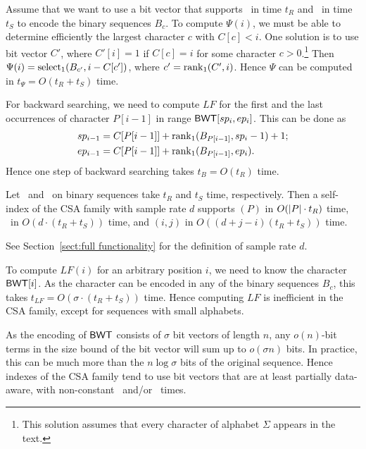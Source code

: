 Assume that we want to use a bit vector that supports \rank\ in time $t_{R}$ and \select\ in time $t_{S}$ to encode the binary sequences $B_{c}$. To compute $\Psi(i)$, we must be able to determine efficiently the largest character $c$ with $C[c] < i$. One solution is to use bit vector $C'$, where $C'[i] = 1$ if $C[c] = i$ for some character $c > 0$.\footnote{This solution assumes that every character of alphabet $\Sigma$ appears in the text.} Then $\Psi(i) = \operatorname{select}_{1}(B_{c'}, i - C[c'])$, where $c' = \operatorname{rank}_{1}(C',i)$. Hence $\Psi$ can be computed in $t_{\Psi} = O(t_{R} + t_{S})$ time.

For backward searching, we need to compute $LF$ for the first and the last occurrences of character $P[i-1]$ in range $\mathsf{BWT}[sp_{i},ep_{i}]$. This can be done as
\begin{align*}
sp_{i-1} & = C[P[i-1]] + \operatorname{rank}_{1}(B_{P[i-1]}, sp_{i}-1) + 1; \\
ep_{i-1} & = C[P[i-1]] + \operatorname{rank}_{1}(B_{P[i-1]}, ep_{i}).
\end{align*}
Hence one step of backward searching takes $t_{B} = O(t_{R})$ time.

\begin{theorem}\label{theorem:csa}
Let \rank\ and \select\ on binary sequences take $t_{R}$ and $t_{S}$ time, respectively. Then a self-index of the CSA family with sample rate $d$ supports \find$(P)$ in $O(\lvert P \rvert \cdot t_{R})$ time, \locate\ in $O(d \cdot (t_{R} + t_{S}))$ time, and \extract$(i,j)$ in $O((d + j - i)(t_{R} + t_{S}))$ time.
\end{theorem}

See Section~\ref{sect:full functionality} for the definition of sample rate $d$.

To compute $LF(i)$ for an arbitrary position $i$, we need to know the character $\mathsf{BWT}[i]$. As the character can be encoded in any of the binary sequences $B_{c}$, this takes $t_{LF} = O(\sigma \cdot (t_{R} + t_{S}))$ time. Hence computing $LF$ is inefficient in the CSA family, except for sequences with small alphabets.

As the encoding of $\mathsf{BWT}$ consists of $\sigma$ bit vectors of length $n$, any $o(n)$\nobreakdash-bit terms in the size bound of the bit vector will sum up to $o(\sigma n)$ bits. In practice, this can be much more than the $n \log \sigma$ bits of the original sequence. Hence indexes of the CSA family tend to use bit vectors that are at least partially data-aware, with non-constant \rank\ and/or \select\ times.

